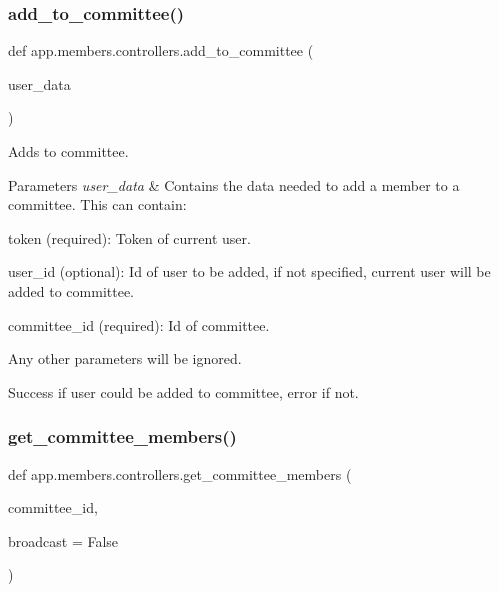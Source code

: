 \subsubsection{\texorpdfstring{add\+\_\+to\+\_\+committee()}{add\_to\_committee()}}
{\footnotesize\ttfamily def app.\+members.\+controllers.\+add\+\_\+to\+\_\+committee (\begin{DoxyParamCaption}\item[{}]{user\+\_\+data }\end{DoxyParamCaption})}



Adds to committee. 


\begin{DoxyParams}{Parameters}
{\em user\+\_\+data} & Contains the data needed to add a member to a committee. This can contain\+:\\
\hline
\end{DoxyParams}

\begin{DoxyItemize}
\item token (required)\+: Token of current user.
\item user\+\_\+id (optional)\+: Id of user to be added, if not specified, current user will be added to committee.
\item committee\+\_\+id (required)\+: Id of committee.
\end{DoxyItemize}

Any other parameters will be ignored.

Success if user could be added to committee, error if not. \mbox{\label{namespaceapp_1_1members_1_1controllers_aa5952443267e1c04b380a533a4e4ea7f}} 
\subsubsection{\texorpdfstring{get\+\_\+committee\+\_\+members()}{get\_committee\_members()}}
{\footnotesize\ttfamily def app.\+members.\+controllers.\+get\+\_\+committee\+\_\+members (\begin{DoxyParamCaption}\item[{}]{committee\+\_\+id,  }\item[{}]{broadcast = {\ttfamily False} }\end{DoxyParamCaption})}



